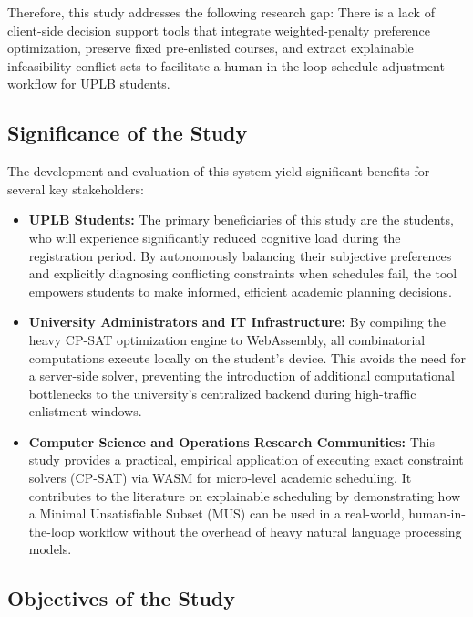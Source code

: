 \documentclass{icsthesis}
\begin{document}
\begin{mainmatter}
		Therefore, this study addresses the following research gap: There is a lack of client-side decision support tools that integrate weighted-penalty preference optimization, preserve fixed pre-enlisted courses, and extract explainable infeasibility conflict sets to facilitate a human-in-the-loop schedule adjustment workflow for UPLB students.
		
		\subsection{Significance of the Study}
		
		The development and evaluation of this system yield significant benefits for several key stakeholders:
		
		\begin{itemize}
			\item \textbf{UPLB Students:} The primary beneficiaries of this study are the students, who will experience significantly reduced cognitive load during the registration period. By autonomously balancing their subjective preferences and explicitly diagnosing conflicting constraints when schedules fail, the tool empowers students to make informed, efficient academic planning decisions.
			
			\item \textbf{University Administrators and IT Infrastructure:} By compiling the heavy CP-SAT optimization engine to WebAssembly, all combinatorial computations execute locally on the student's device. This avoids the need for a server-side solver, preventing the introduction of additional computational bottlenecks to the university's centralized backend during high-traffic enlistment windows.
			
			\item \textbf{Computer Science and Operations Research Communities:} This study provides a practical, empirical application of executing exact constraint solvers (CP-SAT) via WASM for micro-level academic scheduling. It contributes to the literature on explainable scheduling by demonstrating how a Minimal Unsatisfiable Subset (MUS) can be used in a real-world, human-in-the-loop workflow without the overhead of heavy natural language processing models.
		\end{itemize}
		
		\subsection{Objectives of the Study}
		

\end{mainmatter}
\end{document}
